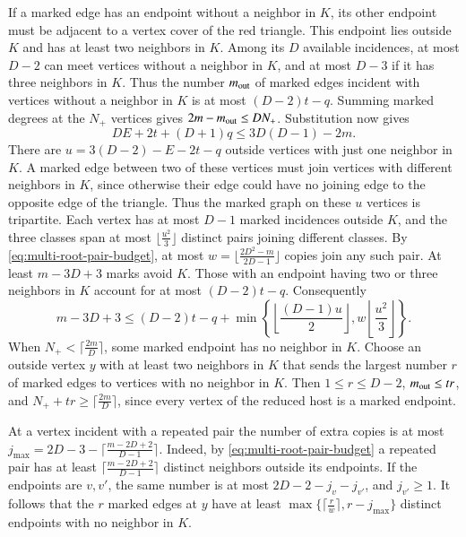 If a marked edge has an endpoint without a neighbor in $K$, its
other endpoint must be adjacent to a vertex cover of the red
triangle. This endpoint lies outside $K$ and has at least two
neighbors in $K$. Among its $D$ available incidences, at most
$D-2$ can meet vertices without a neighbor in $K$, and at most
$D-3$ if it has three neighbors in $K$. Thus the number
$m_{\rm out}$ of marked edges incident with vertices without a
neighbor in $K$ is at most $(D-2)t-q$. Summing marked degrees at
the $N_+$ vertices gives $2m-m_{\rm out}\leq DN_+$. Substitution
now gives
\[
 DE+2t+(D+1)q\le 3D(D-1)-2m.
\]
There are $u=3(D-2)-E-2t-q$ outside vertices with just one neighbor
in $K$. A marked edge between two of these vertices must join vertices
with different neighbors in $K$, since otherwise their edge could
have no joining edge to the opposite edge of the triangle. Thus the
marked graph on these $u$ vertices is tripartite. Each vertex has at
most $D-1$ marked incidences outside $K$, and the three classes span
at most $\lfloor\frac{u^2}{3}\rfloor$ distinct pairs joining different classes.
By \eqref{eq:multi-root-pair-budget}, at most
$w=\lfloor\frac{2D^2-m}{2D-1}\rfloor$ copies join any such pair.
At least $m-3D+3$ marks avoid $K$. Those with an endpoint having two
or three neighbors in $K$ account for at most $(D-2)t-q$. Consequently
\[
 m-3D+3\le (D-2)t-q+
 \min\left\{\left\lfloor\frac{(D-1)u}{2}\right\rfloor,
                  w\left\lfloor\frac{u^2}{3}\right\rfloor\right\}.
\]
When $N_+<\lceil\frac{2m}{D}\rceil$, some marked endpoint has no neighbor
in $K$. Choose an outside vertex $y$ with at least two neighbors in $K$
that sends the largest number $r$ of marked edges to vertices with no
neighbor in $K$. Then $1\le r\le D-2$, $m_{\rm out}\le tr$, and
$N_++tr\ge\lceil\frac{2m}{D}\rceil$, since every vertex of the reduced
host is a marked endpoint.

At a vertex incident with a repeated pair the number of extra copies
is at most
$j_{\max}=2D-3-\lceil\frac{m-2D+2}{D-1}\rceil$. Indeed, by
\eqref{eq:multi-root-pair-budget} a repeated pair has at least
$\lceil\frac{m-2D+2}{D-1}\rceil$ distinct neighbors outside its
endpoints. If the endpoints are $v,v'$, the same number is at most
$2D-2-j_v-j_{v'}$, and $j_{v'}\ge1$. It follows that the $r$
marked edges at $y$ have at least
$\max\{\lceil\frac{r}{w}\rceil,r-j_{\max}\}$ distinct endpoints
with no neighbor in $K$.

